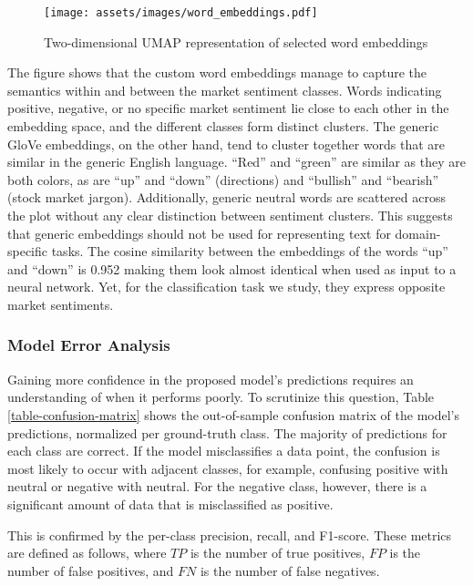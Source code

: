\begin{figure}[!ht]
	\texttt{[image: assets/images/word\_embeddings.pdf]}
	\caption{Two-dimensional UMAP representation of selected word embeddings}
	\label{figure-tsne-word-embeddings}
\end{figure}

The figure shows that the custom word embeddings manage to capture the semantics within and between the market sentiment classes. Words indicating positive, negative, or no specific market sentiment lie close to each other in the embedding space, and the different classes form distinct clusters. The generic GloVe embeddings, on the other hand, tend to cluster together words that are similar in the generic English language. ``Red'' and ``green'' are similar as they are both colors, as are ``up'' and ``down'' (directions) and ``bullish'' and ``bearish'' (stock market jargon). Additionally, generic neutral words are scattered across the plot without any clear distinction between sentiment clusters. This suggests that generic embeddings should not be used for representing text for domain-specific tasks. The cosine similarity between the embeddings of the words ``up'' and ``down'' is 0.952 making them look almost identical when used as input to a neural network. Yet, for the classification task we study, they express opposite market sentiments.


\subsubsection{Model Error Analysis}

\label{section-model-error-analysis}
Gaining more confidence in the proposed model's predictions requires an understanding of when it performs poorly. To scrutinize this question, Table \ref{table-confusion-matrix} shows the out-of-sample confusion matrix of the model's predictions, normalized per ground-truth class. The majority of predictions for each class are correct. If the model misclassifies a data point, the confusion is most likely to occur with adjacent classes, for example, confusing positive with neutral or negative with neutral. For the negative class, however, there is a significant amount of data that is misclassified as positive.





This is confirmed by the per-class precision, recall, and F1-score. These metrics are defined as follows, where $TP$ is the number of true positives, $FP$ is the number of false positives, and $FN$ is the number of false negatives.

